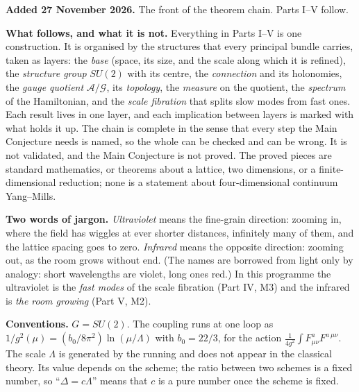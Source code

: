 {\small\color{teal}\textbf{Added 27 November 2026.} The front of the theorem chain. Parts I--V follow.}\par\smallskip

\textbf{What follows, and what it is not.} Everything in Parts I--V is one
construction. It is organised by the structures that every principal bundle
carries, taken as layers: the \emph{base} (space, its size, and the scale
along which it is refined), the \emph{structure group} $SU(2)$ with its centre,
the \emph{connection} and its holonomies, the \emph{gauge quotient}
$\mathcal A/\mathcal G$, its \emph{topology}, the \emph{measure} on the quotient,
the \emph{spectrum} of the Hamiltonian, and the \emph{scale fibration} that
splits slow modes from fast ones. Each result lives in one layer, and each
implication between layers is marked with what holds it up. The chain is
complete in the sense that every step the Main Conjecture needs is named, so
the whole can be checked and can be wrong. It is
not validated, and the Main Conjecture is not proved. The proved pieces are standard mathematics, or
theorems about a lattice, two dimensions, or a finite-dimensional reduction;
none is a statement about four-dimensional continuum Yang--Mills.

\textbf{Two words of jargon.} \emph{Ultraviolet} means the fine-grain
direction: zooming in, where the field has wiggles at ever shorter distances,
infinitely many of them, and the lattice spacing goes to zero. \emph{Infrared}
means the opposite direction: zooming out, as the room grows without end. (The
names are borrowed from light only by analogy: short wavelengths are violet,
long ones red.) In this programme the ultraviolet is the \emph{fast modes} of
the scale fibration (Part IV, M3) and the infrared is \emph{the room growing}
(Part V, M2).

\textbf{Conventions.} $G=SU(2)$. The coupling runs at one loop as
$1/g^2(\mu)=(b_0/8\pi^2)\ln(\mu/\Lambda)$ with $b_0=22/3$, for the action
$\frac{1}{4g^2}\int F^a_{\mu\nu}F^{a\,\mu\nu}$. The scale $\Lambda$ is generated
by the running and does not appear in the classical theory. Its value depends on
the scheme; the ratio between two schemes is a fixed number, so ``$\Delta=c\Lambda$''
means that $c$ is a pure number once the scheme is fixed.


